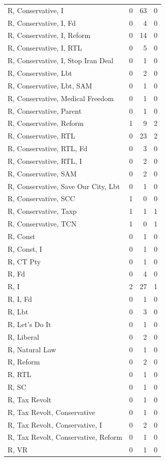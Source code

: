 \begin{supertabular}{lrrr}
R, Conservative, I & 0 & 63 & 0\\
R, Conservative, I, Fd & 0 & 4 & 0\\
R, Conservative, I, Reform & 0 & 14 & 0\\
R, Conservative, I, RTL & 0 & 5 & 0\\
R, Conservative, I, Stop Iran Deal & 0 & 1 & 0\\
R, Conservative, Lbt & 0 & 2 & 0\\
R, Conservative, Lbt, SAM & 0 & 1 & 0\\
R, Conservative, Medical Freedom & 0 & 1 & 0\\
R, Conservative, Parent & 0 & 1 & 0\\
R, Conservative, Reform & 1 & 9 & 2\\
R, Conservative, RTL & 0 & 23 & 2\\
R, Conservative, RTL, Fd & 0 & 3 & 0\\
R, Conservative, RTL, I & 0 & 2 & 0\\
R, Conservative, SAM & 0 & 2 & 0\\
R, Conservative, Save Our City, Lbt & 0 & 1 & 0\\
R, Conservative, SCC & 1 & 0 & 0\\
R, Conservative, Taxp & 1 & 1 & 1\\
R, Conservative, TCN & 1 & 0 & 1\\
R, Const & 0 & 1 & 0\\
R, Const, I & 0 & 1 & 0\\
R, CT Pty & 0 & 1 & 0\\
R, Fd & 0 & 4 & 0\\
R, I & 2 & 27 & 1\\
R, I, Fd & 0 & 1 & 0\\
R, Lbt & 0 & 3 & 0\\
R, Let's Do It & 0 & 1 & 0\\
R, Liberal & 0 & 2 & 0\\
R, Natural Law & 0 & 1 & 0\\
R, Reform & 0 & 2 & 0\\
R, RTL & 0 & 1 & 0\\
R, SC & 0 & 1 & 0\\
R, Tax Revolt & 0 & 1 & 0\\
R, Tax Revolt, Conservative & 0 & 1 & 0\\
R, Tax Revolt, Conservative, I & 0 & 2 & 0\\
R, Tax Revolt, Conservative, Reform & 0 & 1 & 0\\
R, VR & 0 & 1 & 0\\

\end{supertabular}
